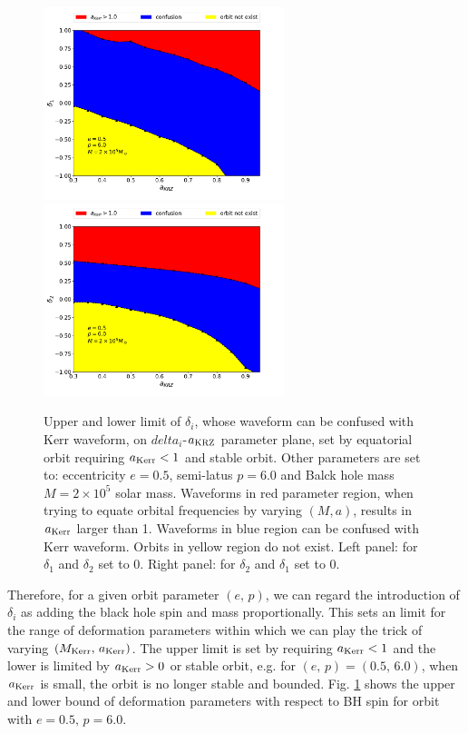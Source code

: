 \documentclass{article}
\begin{document}
\begin{figure}[!ht]
	\centering
	\includegraphics[width=7cm]{2D_bound.pdf}
	\includegraphics[width=7cm]{2D_bound_d2.pdf}
	
	\caption{Upper and lower limit of $\delta_i$, whose waveform can be confused with Kerr waveform, on $delta_i$-$a_{\rm{KRZ}}$ parameter plane, set by equatorial orbit requiring $a_{\rm{Kerr}}<1$ and stable orbit. Other parameters are set to: eccentricity $e=0.5$, semi-latus $p=6.0$ and Balck hole mass $M=2\times10^5$ solar mass. Waveforms in red parameter region, when trying to equate orbital frequencies by varying $(M,a)$, results in $a_{\rm{Kerr}}$ larger than 1. Waveforms in blue region can be confused with Kerr waveform. Orbits in yellow region do not exist. Left panel: for $\delta_1$ and $\delta_2$ set to 0. Right panel: for $\delta_2$ and $\delta_1$ set to 0. }
	\label{d2limit}
\end{figure}

Therefore, for a given orbit parameter $(e,\, p)$, we can regard the introduction of $\delta_i$ as adding the black hole spin and mass proportionally. This sets an limit for the range of deformation parameters within which we can play the trick of varying $(M_{\rm{Kerr}},\, a_{\rm{Kerr}})$. The upper limit is set by requiring $a_{\rm{Kerr}}<1$ and the lower is limited by $a_{\rm{Kerr}}>0$ or stable orbit, e.g. for $(e,\, p)=(0.5,\, 6.0)$, when $a_{\rm{Kerr}}$ is small, the orbit is no longer stable and bounded. Fig. \ref{d2limit} shows the upper and lower bound of deformation parameters with respect to BH spin for orbit with $e=0.5,\, p=6.0$. 
\end{document}
